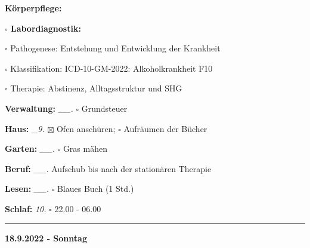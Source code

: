 \documentclass[10pt,a4paper]{article}
\newcommand\prop[1] {{\color {alizarin} {\bf #1}}}        %
\newcommand\rele[1] {{\color {english} \bf {#1}}}         %
\newcommand\mand[1] {{\color {burntorange} {\bf #1}}}     %
\newcommand\ddivide {\vskip -9pt \hrule \vskip 6pt}
\newcommand\bottomspace{\vskip 4pt}
\newcommand\n[1] { {\sl #1.} \hskip 5pt }
\begin{document}
\begin{mdframed}[style=daystyle]
\begin{labeling}{{\mand {Körperpflege:}}}
\begin{minipage}{0.75\textwidth}
\begin{labeling}{{\prop {$\square$ Labordiagnostik:}}}
      \item[$\square$ Pathogenese:]     Entstehung und Entwicklung der Krankheit
      \item[$\square$ Klassifikation:]  ICD-10-GM-2022: Alkoholkrankheit F10
      \item[$\square$ Therapie:]        Abstinenz, Alltagsstruktur und SHG
      \end{labeling}
    \end{minipage}
    \bottomspace
  \item[{\mand {Verwaltung:}}]    \n{\_\_} $\square$ Grundsteuer
  \item[{\mand {Haus:}}]           \n{\_9} $\boxtimes$ Ofen anschüren; $\square$ Aufräumen der Bücher
  \item[{\mand {Garten:}}]        \n{\_\_} $\square$ Gras mähen
  \item[{\mand {Beruf:}}]         \n{\_\_} Aufschub bis nach der stationären Therapie
  \item[{\mand {Lesen:}}]         \n{\_\_} $\square$ Blaues Buch (1 Std.)
  \item[{\mand {Schlaf:}}]          \n{10} $\square$ 22.00 - 06.00
  \end{labeling}
\end{mdframed}


\ddivide
{\rele {18.9.2022 - Sonntag}}
\end{document}
